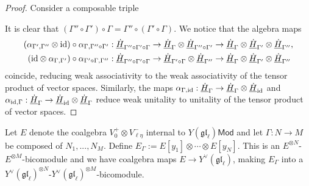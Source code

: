 \documentclass[11pt]{report}
\theoremstyle{definition}
\theoremstyle{remark}
\theoremstyle{remark}
\newcommand{\id}{\textnormal{id}}
\begin{document}
\begin{proof}
Consider a composable triple
\begin{center}
\end{center}
It is clear that $(\Gamma'' \circ \Gamma') \circ \Gamma = \Gamma'' \circ (\Gamma' \circ \Gamma)$. We notice that the algebra maps
\begin{align*}
(\alpha_{\Gamma',\Gamma''} \otimes \id) \circ \alpha_{\Gamma,\Gamma'' \circ \Gamma'}&: \underline{\dot H}_{\Gamma'' \circ \Gamma' \circ \Gamma} \to \underline{\dot H}_\Gamma \otimes \underline{\dot H}_{\Gamma'' \circ \Gamma'} \to \underline{\dot H}_\Gamma \otimes \underline{\dot H}_{\Gamma'} \otimes \underline{\dot H}_{\Gamma''}, \\
(\id \otimes \alpha_{\Gamma,\Gamma'}) \circ \alpha_{\Gamma' \circ \Gamma,\Gamma''}&: \underline{\dot H}_{\Gamma'' \circ \Gamma' \circ \Gamma} \to \underline{\dot H}_{\Gamma' \circ \Gamma} \otimes \underline{\dot H}_{\Gamma''} \to \underline{\dot H}_\Gamma \otimes \underline{\dot H}_{\Gamma'} \otimes \underline{\dot H}_{\Gamma''}
\end{align*}
coincide, reducing weak associativity to the weak associativity of the tensor product of vector spaces. Similarly, the maps $\alpha_{\Gamma,\id}: \underline{\dot H}_\Gamma \to \underline{\dot H}_\Gamma \otimes \underline{\dot H}_\id$ and $\alpha_{\id,\Gamma}: \underline{\dot H}_\Gamma \to \underline{\dot H}_\id \otimes \underline{\dot H}_\Gamma$ reduce weak unitality to unitality of the tensor product of vector spaces.
\end{proof}

Let $E$ denote the coalgebra $V_0^+ \otimes V_{\ell\eta}^-$ internal to $Y(\mathfrak{gl}_\ell)\mathsf{Mod}$ and let $\Gamma: N \to M$ be composed of $N_1,...,N_M$. Define $E_\Gamma := E[y_1] \otimes \cdots \otimes E[y_N]$. This is an $E^{\otimes N}$-$E^{\otimes M}$-bicomodule and we have coalgebra maps $E \to Y^\vee(\mathfrak{gl}_\ell)$, making $E_\Gamma$ into a $Y^\vee(\mathfrak{gl}_\ell)^{\otimes N}$-$Y^\vee(\mathfrak{gl}_\ell)^{\otimes M}$-bicomodule.
\end{document}
